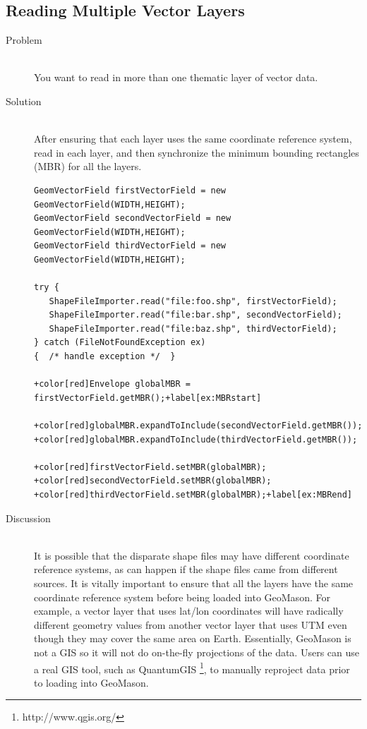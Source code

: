 \documentclass[twoside,10pt]{book}
\begin{document}
\subsection{Reading Multiple Vector Layers}
\label{sub:multiplevectorlayers}

\begin{description}
\item[Problem]~\\
You want to read in more than one thematic layer of vector
data.

\item[Solution]~\\
After ensuring that each layer uses the same coordinate reference
system, read in each layer, and then synchronize the minimum bounding
rectangles (MBR) for all the layers.
\begin{Verbatim}[frame=lines,framesep=5mm,commandchars=+\[\]]
GeomVectorField firstVectorField = new GeomVectorField(WIDTH,HEIGHT);
GeomVectorField secondVectorField = new GeomVectorField(WIDTH,HEIGHT);
GeomVectorField thirdVectorField = new GeomVectorField(WIDTH,HEIGHT);

try {
   ShapeFileImporter.read("file:foo.shp", firstVectorField);
   ShapeFileImporter.read("file:bar.shp", secondVectorField);
   ShapeFileImporter.read("file:baz.shp", thirdVectorField);
} catch (FileNotFoundException ex)
{  /* handle exception */  }

+color[red]Envelope globalMBR = firstVectorField.getMBR();+label[ex:MBRstart]

+color[red]globalMBR.expandToInclude(secondVectorField.getMBR());
+color[red]globalMBR.expandToInclude(thirdVectorField.getMBR());

+color[red]firstVectorField.setMBR(globalMBR);
+color[red]secondVectorField.setMBR(globalMBR);
+color[red]thirdVectorField.setMBR(globalMBR);+label[ex:MBRend]
\end{Verbatim}

\item[Discussion]~\\
It is possible that the disparate shape files may have different
coordinate reference systems, as can happen if the shape files came
from different sources.  It is vitally important to ensure that all
the layers have the same coordinate reference system before being
loaded into GeoMason.  For example, a vector layer that uses lat/lon coordinates
will have radically different geometry values from another vector layer that
uses UTM even though they may cover the same area on Earth.
Essentially, GeoMason is not a GIS so it will not do
on-the-fly projections of the data.  Users can use a real GIS tool,
such as QuantumGIS \footnote{http://www.qgis.org/}, to manually
reproject data prior to loading into GeoMason.


\end{description}
\end{document}
